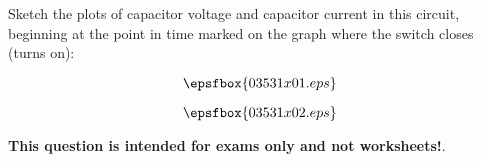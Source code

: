 

Sketch the plots of capacitor voltage and capacitor current in this circuit, beginning at the point in time marked on the graph where the switch closes (turns on):

$$\epsfbox{03531x01.eps}$$







$$\epsfbox{03531x02.eps}$$







{\bf This question is intended for exams only and not worksheets!}.



